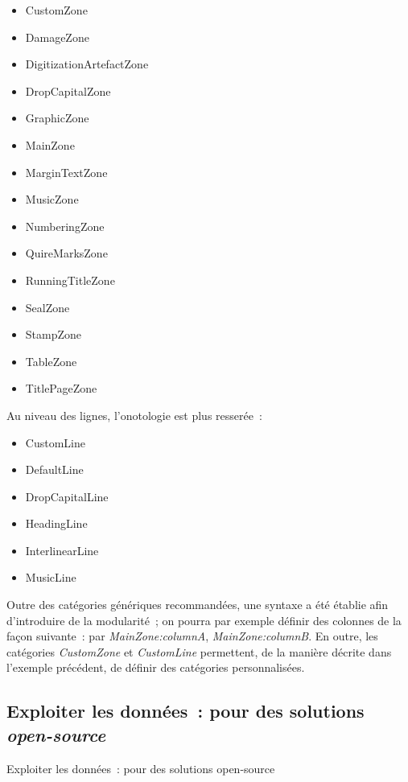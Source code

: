 \documentclass[a4paper,12pt,twoside]{book}
\begin{document}
		\begin{itemize}
			\item
			CustomZone
			\item
			DamageZone
			\item
			DigitizationArtefactZone
			\item
			DropCapitalZone
			\item
			GraphicZone
			\item
			MainZone
			\item
			MarginTextZone
			\item
			MusicZone
			\item
			NumberingZone
			\item
			QuireMarksZone
			\item
			RunningTitleZone
			\item
			SealZone
			\item
			StampZone
			\item
			TableZone
			\item
			TitlePageZone
		\end{itemize}
		
		Au niveau des lignes, l'onotologie est plus resserée~:
		
		\begin{itemize}
			\item
			CustomLine
			\item
			DefaultLine
			\item
			DropCapitalLine
			\item
			HeadingLine
			\item
			InterlinearLine
			\item
			MusicLine
		\end{itemize}
		
		Outre des catégories génériques recommandées, une syntaxe a été établie
		afin d'introduire de la modularité~; on pourra par exemple définir des
		colonnes de la façon suivante~: par \textit{MainZone:columnA},
		\textit{MainZone:columnB}. En outre, les catégories \textit{CustomZone} et
		\textit{CustomLine} permettent, de la manière décrite dans l'exemple
		précédent, de définir des catégories personnalisées.
		
		\subsection{Exploiter les données~: pour des solutions
			\textit{open-source}}{Exploiter les données~: pour des solutions open-source}
		
\end{document}
